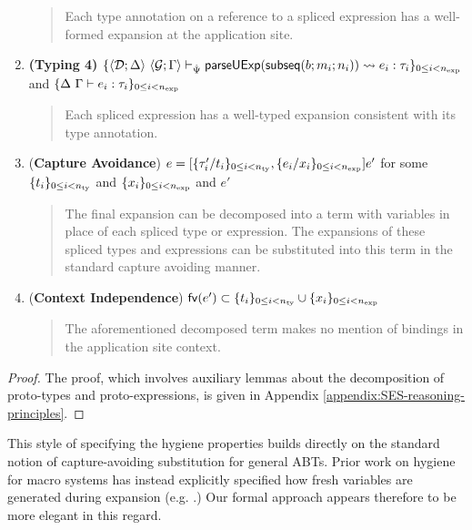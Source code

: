 \begin{theorem}
\begin{enumerate}
\begin{quote}
  Each type annotation on a reference to a spliced expression has a well-formed expansion at the application site.
\end{quote}
\item \textbf{(Typing 4)} $\{
  \langle \mathcal{D}; \Delta \rangle~\langle \mathcal{G}; \Gamma \rangle \vdash_{\hat{\Psi}} \mathsf{parseUExp}(\mathsf{subseq}(b; m_i; n_i)) \leadsto e_i : \tau_i
\}_{0 \leq i < n_\text{exp}}$ and $\{\Delta~\Gamma \vdash e_i : \tau_i\}_{0 \leq i < n_\text{exp}}$
\begin{quote}
  Each spliced expression has a well-typed expansion consistent with its type annotation.
\end{quote}
\item (\textbf{Capture Avoidance}) $e = [\{\tau'_i/t_i\}_{0 \leq i < n_\text{ty}}, \{e_i/x_i\}_{0 \leq i < n_\text{exp}}]e'$ for some $\{t_i\}_{0 \leq i < n_\text{ty}}$ and $\{x_i\}_{0 \leq i < n_\text{exp}}$ and $e'$
  \begin{quote}
    The final expansion can be decomposed into a  term with variables in place of each spliced type or expression. The expansions of these spliced types and expressions can be substituted into this term in the standard capture avoiding manner.
  \end{quote}
\item (\textbf{Context Independence}) $\mathsf{fv}(e') \subset \{t_i\}_{0 \leq i < n_\text{ty}} \cup \{x_i\}_{0 \leq i < n_\text{exp}}$
  \begin{quote}
    The aforementioned decomposed term makes no mention of bindings in the application site context.
  \end{quote}
\end{enumerate}
\end{theorem}
\begin{proof} The proof, which involves auxiliary lemmas about the decomposition of proto-types and proto-expressions, is given in Appendix \ref{appendix:SES-reasoning-principles}.
\end{proof}
\endgroup

This style of specifying the hygiene properties builds directly on the standard notion of capture-avoiding substitution for general ABTs. Prior work on hygiene for macro systems has instead explicitly specified how fresh variables are generated during expansion (e.g. \cite{DBLP:conf/esop/HermanW08}.) Our formal approach appears therefore to be more elegant in this regard.

